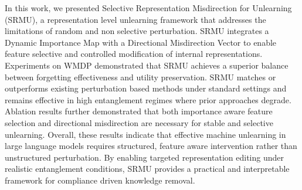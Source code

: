 In this work, we presented Selective Representation Misdirection for Unlearning (SRMU), a representation level unlearning framework that addresses the limitations of random and non selective perturbation. SRMU integrates a Dynamic Importance Map with a Directional Misdirection Vector to enable feature selective and controlled modification of internal representations. Experiments on WMDP demonstrated that SRMU achieves a superior balance between forgetting effectiveness and utility preservation.
SRMU matches or outperforms existing perturbation based methods under standard settings and remains effective in high entanglement regimes where prior approaches degrade. Ablation results further demonstrated that both importance aware feature selection and directional misdirection are necessary for stable and selective unlearning. Overall, these results indicate that effective machine unlearning in large language models requires structured, feature aware intervention rather than unstructured perturbation. By enabling targeted representation editing under realistic entanglement conditions, SRMU provides a practical and interpretable framework for compliance driven knowledge removal.

